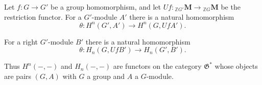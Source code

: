 Let $f: G \to G'$ be a group homomorphism, and let $Uf: {}_{\mathbb{Z}G'}\mathbf{M} \to {}_{\mathbb{Z}G}\mathbf{M}$ be the restriction functor. For a $G'$-module $A'$ there is a natural homomorphism
$$\theta: H^n(G', A') \to H^n(G, UfA').$$

For a right $G'$-module $B'$ there is a natural homomorphism
$$\theta: H_n(G, UfB') \to H_n(G', B').$$

Thus $H^n(-, -)$ and $H_n(-, -)$ are functors on the category $\mathfrak{G}^*$ whose objects are pairs $(G, A)$ with $G$ a group and $A$ a $G$-module.
